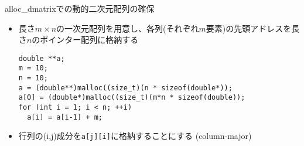 \begin{frame}[t,fragile]{alloc\_dmatrixでの動的二次元配列の確保}
  \begin{itemize}
  \item 長さ$m \times n$の一次元配列を用意し、各列(それぞれ$m$要素)の先頭アドレスを長さ$n$のポインター配列に格納する
\begin{lstlisting}
double **a;
m = 10;  
n = 10;  
a = (double**)malloc((size_t)(n * sizeof(double*));
a[0] = (double*)malloc((size_t)(m*n * sizeof(double));
for (int i = 1; i < n; ++i)
  a[i] = a[i-1] + m;
\end{lstlisting}
\item 行列の(i,j)成分を\verb+a[j][i]+に格納することにする (column-major)
  \end{itemize}
\end{frame}
